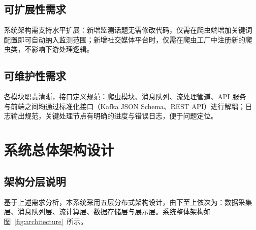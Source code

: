 \subsection{可扩展性需求}

系统架构需支持水平扩展：新增监测话题无需修改代码，仅需在爬虫端增加关键词配置即可自动纳入监测范围；新增社交媒体平台时，仅需在爬虫工厂中注册新的爬虫类，不影响下游处理逻辑。

\subsection{可维护性需求}

各模块职责清晰，接口定义规范：爬虫模块、消息队列、流处理管道、API 服务与前端之间均通过标准化接口（Kafka JSON Schema、REST API）进行解耦；日志输出规范，关键处理节点有明确的进度与错误日志，便于问题定位。

\section{系统总体架构设计}

\subsection{架构分层说明}

基于上述需求分析，本系统采用五层分布式架构设计，由下至上依次为：数据采集层、消息队列层、流计算层、数据存储层与展示层。系统整体架构如图~\ref{fig:architecture}~所示。

